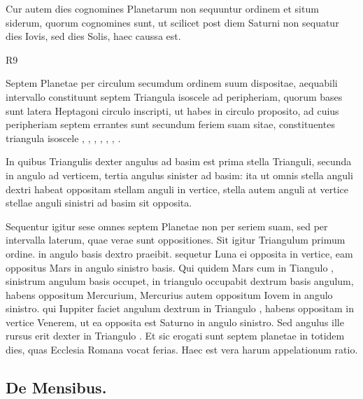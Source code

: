 Cur autem dies cognomines Planetarum non sequuntur ordinem et
situm siderum, quorum cognomines sunt, ut scilicet post diem Saturni
non sequatur dies Iovis, sed dies Solis, haec caussa est.
\begin{wrapfigure}[9]{R}{9\baselineskip}
  \centering
  \def\svgwidth{9\baselineskip}
  {\astrofont}
\end{wrapfigure}

Septem Planetae
per circulum secumdum ordinem suum
dispositae, aequabili intervallo constituunt septem
Triangula isoscele ad peripheriam, quorum
bases sunt latera Heptagoni circulo inscripti,
ut habes in circulo proposito, ad cuius
peripheriam septem errantes sunt secundum
feriem suam sitae, constituentes triangula
isoscele , , ,
 , , , .

In quibus Triangulis dexter angulus ad basim
est prima stella Trianguli, secunda in angulo ad verticem, tertia angulus
sinister ad basim: ita ut omnis stella anguli dextri habeat oppositam
stellam anguli in vertice, stella autem anguli at vertice stellae
anguli sinistri ad basim sit opposita.

Sequentur igitur sese omnes septem
Planetae non per seriem suam, sed per intervalla laterum, quae
verae sunt oppositiones.
Sit igitur Triangulum  primum ordine.
 in angulo basis dextro praeibit. sequetur Luna ei
 opposita in vertice,
eam oppositus Mars in angulo sinistro basis.
Qui quidem Mars cum in
Tiangulo , sinistrum angulum basis occupet,
 in triangulo  occupabit
dextrum basis angulum, habens oppositum Mercurium,
Mercurius autem oppositum Iovem in angulo sinistro.
qui Iuppiter
faciet angulum dextrum in Triangulo , habens oppositam in vertice
Venerem, ut ea opposita est Saturno in angulo sinistro.
Sed angulus
ille rursus erit dexter in Triangulo .
Et sic erogati sunt septem
planetae in totidem dies, quas Ecclesia Romana vocat ferias.
Haec est vera harum appelationum ratio.

\subsection{De Mensibus.}

